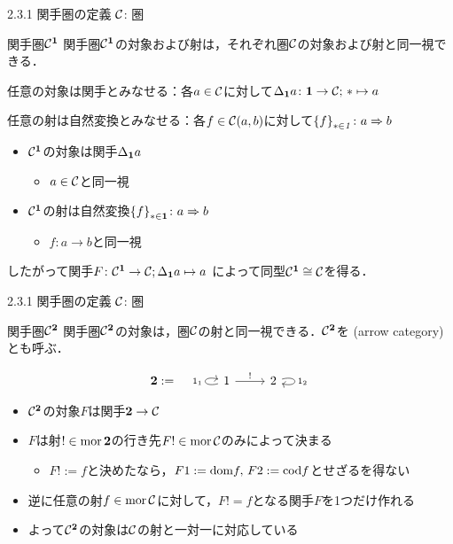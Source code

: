 \documentclass[uplatex,a4paper,dvipdfmx,aspectratio=169,10pt]{beamer}
\begin{document}
\begin{frame}[fragile]{2.3.1 関手圏の定義}
    $\mathcal{C}$: 圏
    \begin{exampleblock}{ 関手圏$\mathcal{C}^{\mathord{\mathbf{1}}}$}
        関手圏$\mathcal{C}^{\mathord{\mathbf{1}}}$の対象および射は，それぞれ圏$\mathcal{C}$の対象および射と同一視できる．
    \end{exampleblock}
     任意の対象は関手とみなせる：各$a \in \mathcal{C}$に対して$\Delta_{{\mathord{\mathbf{1}}}}a \colon {\mathord{\mathbf{1}}} \to \mathcal{C};\, * \mapsto a$

     任意の射は自然変換とみなせる：各$f \in \mathcal{C}(a, b)$に対して$\qty{f}_{* \in {\mathord{\mathit{1}}}} \colon a \Rightarrow b$

    \begin{itemize}
        \item $\mathcal{C}^{\mathord{\mathbf{1}}}$の対象は関手$\Delta_{{\mathord{\mathbf{1}}}}a$
            \begin{itemize}
                \item $a \in \mathcal{C}$と同一視
            \end{itemize}
        \item $\mathcal{C}^{\mathord{\mathbf{1}}}$の射は自然変換$\qty{f}_{* \in {\mathord{\mathbf{1}}}}\colon a \Rightarrow b$
            \begin{itemize}
                \item $f \colon a \to b$と同一視
            \end{itemize}
    \end{itemize}
    したがって関手$F \colon \mathcal{C}^{\mathord{\mathbf{1}}} \to \mathcal{C}; \Delta_{{\mathord{\mathbf{1}}}}a \mapsto a$ によって同型$\mathcal{C}^{\mathord{\mathbf{1}}} \cong \mathcal{C}$を得る．
\end{frame}

\begin{frame}[fragile]{2.3.1 関手圏の定義}
    $\mathcal{C}$: 圏
    \begin{exampleblock}{ 関手圏$\mathcal{C}^{\mathord{\mathbf{2}}}$}
        関手圏$\mathcal{C}^{\mathord{\mathbf{2}}}$の対象は，圏$\mathcal{C}$の射と同一視できる．$\mathcal{C}^{\mathord{\mathbf{2}}}$を (arrow category) とも呼ぶ．
    \end{exampleblock}
    \begin{equation*}
        \twobf := \quad \begin{tikzcd}
            1 \arrow[loop left, "1_1"] \arrow[r, "!"] & 2 \arrow[loop right, "1_2"]
        \end{tikzcd}
    \end{equation*}
    \begin{itemize}
        \item $\mathcal{C}^{\mathord{\mathbf{2}}}$の対象$F$は関手${\mathord{\mathbf{2}}} \to \mathcal{C}$
        \item $F$は射$! \in \operatorname{{\mathrm{mor}}} {\mathord{\mathbf{2}}}$の行き先$F! \in \operatorname{{\mathrm{mor}}} \mathcal{C}$のみによって決まる
            \begin{itemize}
                \item $F! := f$と決めたなら，$F1 := \mathord{\mathrm{dom}} f,\, F2 := \mathord{\mathrm{cod}} f$とせざるを得ない
            \end{itemize}
        \item 逆に任意の射$f \in \operatorname{{\mathrm{mor}}} \mathcal{C}$に対して，$F! = f$となる関手$F$を1つだけ作れる
        \item よって$\mathcal{C}^{\mathord{\mathbf{2}}}$の対象は$\mathcal{C}$の射と一対一に対応している
    \end{itemize}
\end{frame}
\end{document}
